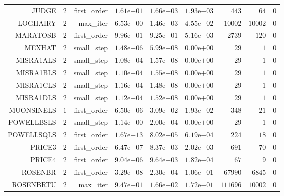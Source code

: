 \begin{longtable}{rrrrrrrrr}
JUDGE & \(     2\) & first\_order & \( 1.61\)e\(+01\) & \( 1.66\)e\(-03\) & \( 1.93\)e\(-03\) & \(   443\) & \(    64\) & \(     0\) \\
LOGHAIRY & \(     2\) & max\_iter & \( 6.53\)e\(+00\) & \( 1.46\)e\(-03\) & \( 4.55\)e\(-02\) & \( 10002\) & \( 10002\) & \(     0\) \\
MARATOSB & \(     2\) & first\_order & \( 9.96\)e\(-01\) & \( 9.25\)e\(-01\) & \( 5.16\)e\(-03\) & \(  2739\) & \(   120\) & \(     0\) \\
MEXHAT & \(     2\) & small\_step & \( 1.48\)e\(+06\) & \( 5.99\)e\(+08\) & \( 0.00\)e\(+00\) & \(    29\) & \(     1\) & \(     0\) \\
MISRA1ALS & \(     2\) & small\_step & \( 1.08\)e\(+04\) & \( 1.57\)e\(+08\) & \( 0.00\)e\(+00\) & \(    29\) & \(     1\) & \(     0\) \\
MISRA1BLS & \(     2\) & small\_step & \( 1.10\)e\(+04\) & \( 1.55\)e\(+08\) & \( 0.00\)e\(+00\) & \(    29\) & \(     1\) & \(     0\) \\
MISRA1CLS & \(     2\) & small\_step & \( 1.16\)e\(+04\) & \( 1.48\)e\(+08\) & \( 0.00\)e\(+00\) & \(    29\) & \(     1\) & \(     0\) \\
MISRA1DLS & \(     2\) & small\_step & \( 1.12\)e\(+04\) & \( 1.52\)e\(+08\) & \( 0.00\)e\(+00\) & \(    29\) & \(     1\) & \(     0\) \\
MUONSINELS & \(     1\) & first\_order & \( 6.50\)e\(-06\) & \( 3.09\)e\(-02\) & \( 1.93\)e\(-02\) & \(   348\) & \(    21\) & \(     0\) \\
POWELLBSLS & \(     2\) & small\_step & \( 1.14\)e\(+00\) & \( 2.00\)e\(+04\) & \( 0.00\)e\(+00\) & \(    29\) & \(     1\) & \(     0\) \\
POWELLSQLS & \(     2\) & first\_order & \( 1.67\)e\(-13\) & \( 8.02\)e\(-05\) & \( 6.19\)e\(-04\) & \(   224\) & \(    18\) & \(     0\) \\
PRICE3 & \(     2\) & first\_order & \( 6.47\)e\(-07\) & \( 8.37\)e\(-03\) & \( 2.02\)e\(-03\) & \(   691\) & \(    70\) & \(     0\) \\
PRICE4 & \(     2\) & first\_order & \( 9.04\)e\(-06\) & \( 9.64\)e\(-03\) & \( 1.82\)e\(-04\) & \(    67\) & \(     9\) & \(     0\) \\
ROSENBR & \(     2\) & first\_order & \( 3.29\)e\(-08\) & \( 2.30\)e\(-04\) & \( 1.06\)e\(-01\) & \( 67990\) & \(  6845\) & \(     0\) \\
ROSENBRTU & \(     2\) & max\_iter & \( 9.47\)e\(-01\) & \( 1.66\)e\(-02\) & \( 1.72\)e\(-01\) & \(111696\) & \( 10002\) & \(     0\) \\

\end{longtable}
